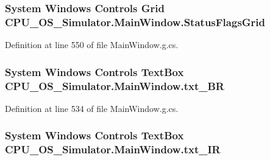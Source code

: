 \subsubsection[{Status\+Flags\+Grid}]{\setlength{\rightskip}{0pt plus 5cm}System Windows Controls Grid C\+P\+U\+\_\+\+O\+S\+\_\+\+Simulator.\+Main\+Window.\+Status\+Flags\+Grid\hspace{0.3cm}{\ttfamily [package]}}\label{class_c_p_u___o_s___simulator_1_1_main_window_afdda5e5a39c6e3b99300284ea2640e7c}


Definition at line 550 of file Main\+Window.\+g.\+cs.

\hypertarget{class_c_p_u___o_s___simulator_1_1_main_window_a7a878022ed4cb948598d3685dc821a00}{}
\subsubsection[{txt\+\_\+\+B\+R}]{\setlength{\rightskip}{0pt plus 5cm}System Windows Controls Text\+Box C\+P\+U\+\_\+\+O\+S\+\_\+\+Simulator.\+Main\+Window.\+txt\+\_\+\+B\+R\hspace{0.3cm}{\ttfamily [package]}}\label{class_c_p_u___o_s___simulator_1_1_main_window_a7a878022ed4cb948598d3685dc821a00}


Definition at line 534 of file Main\+Window.\+g.\+cs.

\hypertarget{class_c_p_u___o_s___simulator_1_1_main_window_ac6e0cfcdd72688d7bffd100ce6d11a28}{}
\subsubsection[{txt\+\_\+\+I\+R}]{\setlength{\rightskip}{0pt plus 5cm}System Windows Controls Text\+Box C\+P\+U\+\_\+\+O\+S\+\_\+\+Simulator.\+Main\+Window.\+txt\+\_\+\+I\+R\hspace{0.3cm}{\ttfamily [package]}}\label{class_c_p_u___o_s___simulator_1_1_main_window_ac6e0cfcdd72688d7bffd100ce6d11a28}


